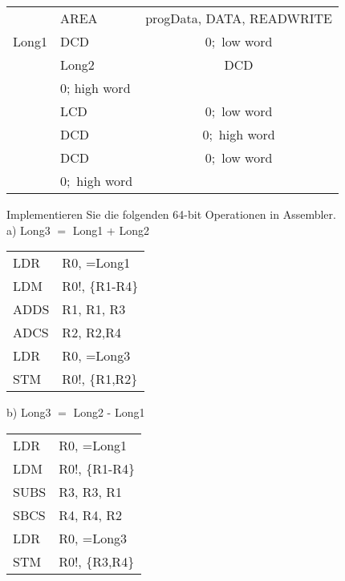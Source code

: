 \documentclass[10pt]{article}
\begin{document}
\begin{center}
\begin{tabular}{llc}
 & AREA & progData, DATA, READWRITE \\
Long1 & DCD & $0 ;$ low word \\
 & Long2 & DCD \\
 & 0; high word &  \\
 & LCD & $0 ;$ low word \\
 & DCD & $0 ;$ high word \\
 & DCD & $0 ;$ low word \\
 & $0 ;$ high word &  \\
\end{tabular}
\end{center}

Implementieren Sie die folgenden 64-bit Operationen in Assembler.\\
a) Long3 $=$ Long1 + Long2

\begin{center}
\begin{tabular}{ll}
LDR & R0, =Long1 \\
LDM & R0!, \{R1-R4\} \\
ADDS & R1, R1, R3 \\
ADCS & R2, R2,R4 \\
LDR & R0, =Long3 \\
STM & R0!, \{R1,R2\} \\
\end{tabular}
\end{center}

b) Long3 $=$ Long2 - Long1

\begin{center}
\begin{tabular}{ll}
LDR & R0, =Long1 \\
LDM & R0!, \{R1-R4\} \\
SUBS & R3, R3, R1 \\
SBCS & R4, R4, R2 \\
LDR & R0, =Long3 \\
STM & R0!, \{R3,R4\} \\
\end{tabular}
\end{center}
\end{document}

